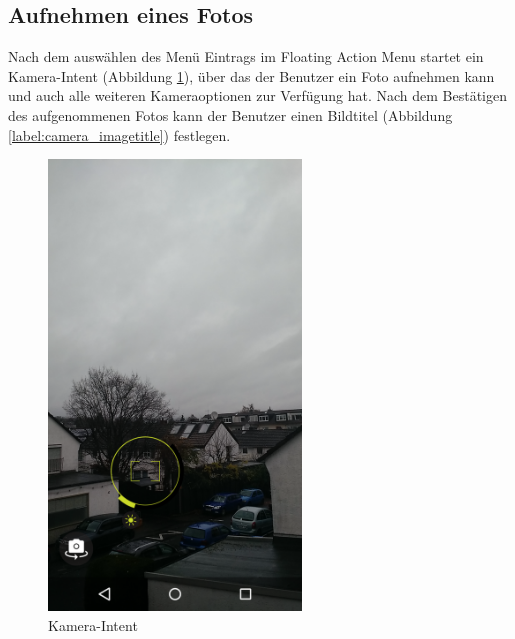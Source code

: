 \subsection{Aufnehmen eines Fotos}
Nach dem auswählen des Menü Eintrags im Floating Action Menu startet ein Kamera-Intent (Abbildung \ref{label:camera}), über das der Benutzer ein Foto aufnehmen kann und auch alle weiteren Kameraoptionen zur Verfügung hat. Nach dem Bestätigen des aufgenommenen Fotos kann der Benutzer einen Bildtitel (Abbildung \ref{label:camera_imagetitle}) festlegen.
\begin{figure}[H]
\centering
	\begin{minipage}{0.4\textwidth} 
	\centering
	\includegraphics[width=0.6\textwidth]{images/screenshots/camera.png}
	\caption{Kamera-Intent}
	\label{label:camera}
	\end{minipage}
	\hfill
	\begin{minipage}{0.4\textwidth}
	\centering

\end{minipage}
\end{figure}
